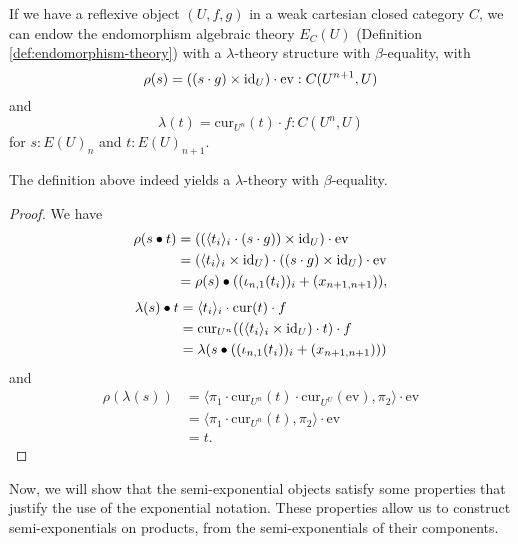 \begin{definition}
  If we have a reflexive object $ (U, f, g) $ in a weak cartesian closed category $ C $, we can endow the endomorphism algebraic theory $ E_C(U) $ (Definition \ref{def:endomorphism-theory}) with a $ \lambda $-theory structure with $ \beta $-equality, with
  \[ \rho(s) = ((s \cdot g) \times \text{id}_{U}) \cdot \mathrm{ev} : C(U^{n + 1}, U) \]
  and
  \[ \lambda(t) = \mathrm{cur}_{U^n}(t) \cdot f : C(U^n, U) \]
  for $ s: E(U)_n $ and $ t: E(U)_{n + 1} $.
\end{definition}

\begin{lemma}
  The definition above indeed yields a $ \lambda $-theory with $ \beta $-equality.
\end{lemma}
\begin{proof}
  We have
  \begin{align*}
    \rho(s \bullet t)
    &= ((\langle t_i \rangle_i \cdot (s \cdot g)) \times \text{id}_{U}) \cdot \mathrm{ev}\\
    &= (\langle t_i \rangle_i \times \text{id}_{U}) \cdot ((s \cdot g) \times \text{id}_{U}) \cdot \mathrm{ev}\\
    &= \rho(s) \bullet ((\iota_{n, 1}(t_i))_i + (x_{n + 1, n + 1})),
  \end{align*}
  \begin{align*}
    \lambda(s) \bullet t
    &= \langle t_i \rangle_i \cdot \mathrm{cur}(t) \cdot f\\
    &= \mathrm{cur}_{U^n}((\langle t_i \rangle_i \times \text{id}_{U}) \cdot t) \cdot f\\
    &= \lambda(s \bullet ((\iota_{n, 1}(t_i))_i + (x_{n + 1, n + 1})))
  \end{align*}
  and
  \begin{align*}
    \rho(\lambda(s))
    &= \langle \pi_1 \cdot \mathrm{cur}_{U^n}(t) \cdot \mathrm{cur}_{U^U}(\mathrm{ev}), \pi_2 \rangle \cdot \mathrm{ev}\\
    &= \langle \pi_1 \cdot \mathrm{cur}_{U^n}(t), \pi_2 \rangle \cdot \mathrm{ev}\\
    &= t.
  \end{align*}
\end{proof}

Now, we will show that the semi-exponential objects satisfy some properties that justify the use of the exponential notation. These properties allow us to construct semi-exponentials on products, from the semi-exponentials of their components.

